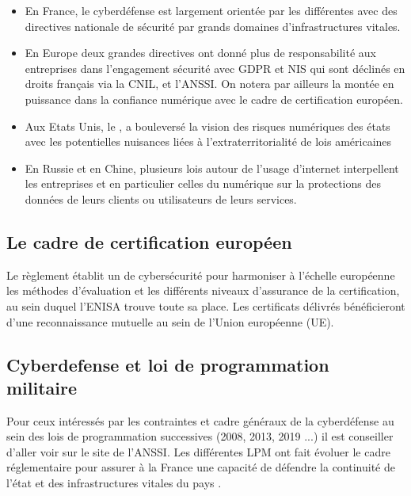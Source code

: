 \begin{itemize}
 \item En France, le cyberdéfense est largement orientée par les différentes  avec des directives nationale de sécurité par grands domaines d'infrastructures vitales.
 \item En Europe deux grandes directives ont donné plus de responsabilité aux entreprises dans l'engagement sécurité avec GDPR et NIS qui sont déclinés en droits français via la CNIL, et l'ANSSI. On notera par ailleurs la montée en puissance dans la confiance numérique avec le cadre de certification européen.
 \item Aux Etats Unis, le , a bouleversé la vision des risques numériques des états avec les potentielles nuisances liées à l'extraterritorialité de lois américaines
 \item En Russie et en Chine, plusieurs lois autour de l'usage d'internet interpellent les entreprises et en particulier celles du numérique sur la protections des données de leurs clients ou utilisateurs de leurs services.
\end{itemize}


\subsection{Le cadre de certification européen}

Le règlement établit un 
 de cybersécurité pour harmoniser à l’échelle européenne les méthodes d’évaluation et les différents niveaux d’assurance de la certification, au sein duquel l’ENISA trouve toute sa place. Les certificats délivrés bénéficieront d’une reconnaissance mutuelle au sein de l’Union européenne (UE). 

\subsection{Cyberdefense et loi de programmation militaire}
Pour ceux intéressés par les contraintes et cadre généraux de la cyberdéfense au sein des lois de programmation successives (2008, 2013, 2019 ...) il est conseiller d'aller voir sur le site de l'ANSSI. Les différentes LPM ont fait évoluer le cadre réglementaire pour assurer à la France une capacité de défendre la continuité de l'état et des infrastructures vitales du pays .

